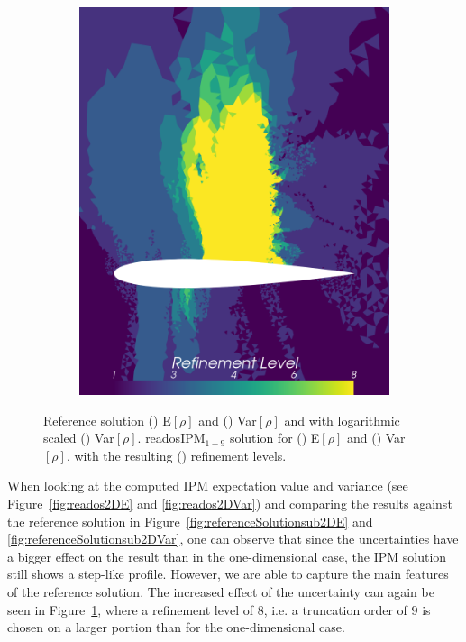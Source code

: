 \begin{figure}[h!]
\begin{subfigure}{0.3\linewidth}
		\includegraphics[scale=0.2]{figs/Euler2D/retadosIPM9-4MaP_4_refinementLevel.png}
		\caption{}
		\label{fig:readosIPMEVar2DRefinement}
	\end{subfigure}
	\caption{Reference solution () E$[\rho]$ and () Var$[\rho]$ and with logarithmic scaled () Var$[\rho]$. readosIPM$_{1-9}$ solution for () E$[\rho]$ and () Var$[\rho]$, with the resulting () refinement levels.}
	\label{fig:refAndreadosIPMEVar2D}
\end{figure}
When looking at the computed IPM expectation value and variance (see Figure~\ref{fig:reados2DE} and \ref{fig:reados2DVar}) and comparing the results against the reference solution in Figure~\ref{fig:referenceSolutionsub2DE} and \ref{fig:referenceSolutionsub2DVar}, one can observe that since the uncertainties have a bigger effect on the result than in the one-dimensional case, the IPM solution still shows a step-like profile. However, we are able to capture the main features of the reference solution. The increased effect of the uncertainty can again be seen in Figure~\ref{fig:readosIPMEVar2DRefinement}, where a refinement level of $8$, i.e. a truncation order of $9$ is chosen on a larger portion than for the one-dimensional case. 

